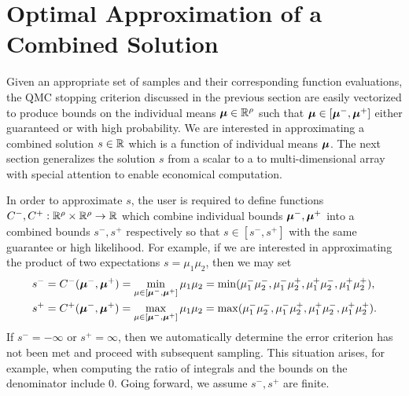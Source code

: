 \documentclass{article}[12pt]
\begin{document}
\section{Optimal Approximation of a Combined Solution}

Given an appropriate set of  samples and their corresponding function evaluations, the QMC stopping criterion discussed in the previous section are easily vectorized to produce bounds on the individual means $\boldsymbol{\mu} \in \mathbb{R}^\rho$ such that $\boldsymbol{\mu} \in [\boldsymbol{\mu}^-,\boldsymbol{\mu}^+]$ either guaranteed or with high probability. We are interested in approximating a combined solution $s \in \mathbb{R}$ which is a function of individual means $\boldsymbol{\mu}$.  The next section generalizes the solution $s$ from a scalar to a to multi-dimensional array with special attention to enable economical computation.

In order to approximate $s$, the user is required to define functions $C^-,C^+: \mathbb{R}^\rho \times \mathbb{R}^\rho \to \mathbb{R}$ which combine individual bounds $\boldsymbol{\mu}^-,\boldsymbol{\mu}^+$ into a combined bounds $s^-,s^+$ respectively so that $s \in [s^-,s^+]$ with the same guarantee or high likelihood. For example, if we are interested in approximating the product of two expectations $s=\mu_1\mu_2$, then we may set
\begin{align*}
    s^- &= C^-(\boldsymbol{\mu}^-,\boldsymbol{\mu}^+) = \min_{\mu \in [\boldsymbol{\mu}^-,\boldsymbol{\mu}^+]} \mu_1\mu_2 = \min(\mu_1^-\mu_2^-,\mu_1^-\mu_2^+,\mu_1^+\mu_2^-,\mu_1^+\mu_2^+), \\
    s^+ &= C^+(\boldsymbol{\mu}^-,\boldsymbol{\mu}^+) = \max_{\mu \in [\boldsymbol{\mu}^-,\boldsymbol{\mu}^+]} \mu_1\mu_2 = \max(\mu_1^-\mu_2^-,\mu_1^-\mu_2^+,\mu_1^+\mu_2^-,\mu_1^+\mu_2^+).
\end{align*}
If $s^-=-\infty$ or $s^+=\infty$, then we automatically determine the error criterion has not been met and proceed with subsequent sampling. This situation arises, for example, when computing the ratio of integrals and the bounds on the denominator include 0. Going forward, we assume $s^-,s^+$ are finite. 
\end{document}
